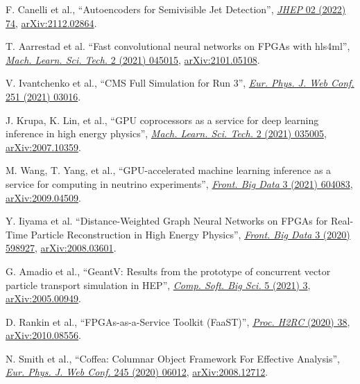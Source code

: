 \begin{description}[leftmargin=12pt,font=\normalfont,labelsep=0em]
\item F. Canelli et al., ``Autoencoders for Semivisible Jet Detection'', \href{https://doi.org/10.1007/JHEP02(2022)074}{\emph{JHEP} 02 (2022) 74}, \href{https://arxiv.org/abs/2112.02864}{arXiv:2112.02864}. %
\item T. Aarrestad et al. ``Fast convolutional neural networks on FPGAs with hls4ml'', \href{https://doi.org/10.1088/2632-2153/ac0ea1}{\emph{Mach. Learn. Sci. Tech.} 2 (2021) 045015}, \href{https://arxiv.org/abs/2101.05108}{arXiv:2101.05108}. %
\item V. Ivantchenko et al., ``CMS Full Simulation for Run 3'', \href{https://doi.org/10.1051/epjconf/202125103016}{\emph{Eur. Phys. J. Web Conf.} 251 (2021) 03016}. %
\item J. Krupa, K. Lin, et al., ``GPU coprocessors as a service for deep learning inference in high energy physics'', \href{https://doi.org/10.1088/2632-2153/abec21}{\emph{Mach. Learn. Sci. Tech.} 2 (2021) 035005}, \href{https://arxiv.org/abs/2007.10359}{arXiv:2007.10359}. %
\item M. Wang, T. Yang, et al., ``GPU-accelerated machine learning inference as a service for computing in neutrino experiments'', \href{https://doi.org/10.3389/fdata.2020.604083}{\emph{Front. Big Data} 3 (2021) 604083}, \href{https://arxiv.org/abs/2009.04509}{arXiv:2009.04509}. %
\item Y. Iiyama et al. ``Distance-Weighted Graph Neural Networks on FPGAs for Real-Time Particle Reconstruction in High Energy Physics'', \href{https://doi.org/10.3389/fdata.2020.598927}{\emph{Front. Big Data} 3 (2020) 598927}, \href{https://arxiv.org/abs/2008.03601}{arXiv:2008.03601}. %
\item \begin{sloppypar}G. Amadio et al., ``GeantV: Results from the prototype of concurrent vector particle transport simulation in HEP'', \href{https://doi.org/10.1007/s41781-020-00048-6}{\emph{Comp. Soft. Big Sci.} 5 (2021) 3}, \href{https://arxiv.org/abs/2005.00949}{arXiv:2005.00949}.\end{sloppypar} %
\item D. Rankin et al., ``FPGAs-as-a-Service Toolkit (FaaST)'', \href{https://doi.ieeecomputersociety.org/10.1109/H2RC51942.2020.00010}{\emph{Proc. H2RC} (2020) 38}, \href{https://arxiv.org/abs/2010.08556}{arXiv:2010.08556}. %
\item N. Smith et al., ``Coffea: Columnar Object Framework For Effective Analysis'', \href{https://doi.org/10.1051/epjconf/202024506012}{\emph{Eur. Phys. J. Web Conf.} 245 (2020) 06012}, \href{https://arxiv.org/abs/2008.12712}{arXiv:2008.12712}. %

\end{description}
